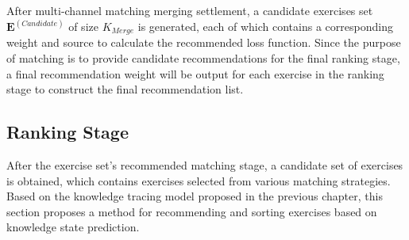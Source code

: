 

After multi-channel matching merging settlement, a candidate exercises set \(\mathbf{E}^{(Candidate)}\) of size \(K_{Merge}\) is generated, each of which contains a corresponding weight and source to calculate the recommended loss function. Since the purpose of matching is to provide candidate recommendations for the final ranking stage, a final recommendation weight will be output for each exercise in the ranking stage to construct the final recommendation list.

\subsection{Ranking Stage}


After the exercise set's recommended matching stage, a candidate set of exercises is obtained, which contains exercises selected from various matching strategies. Based on the knowledge tracing model proposed in the previous chapter, this section proposes a method for recommending and sorting exercises based on knowledge state prediction.

